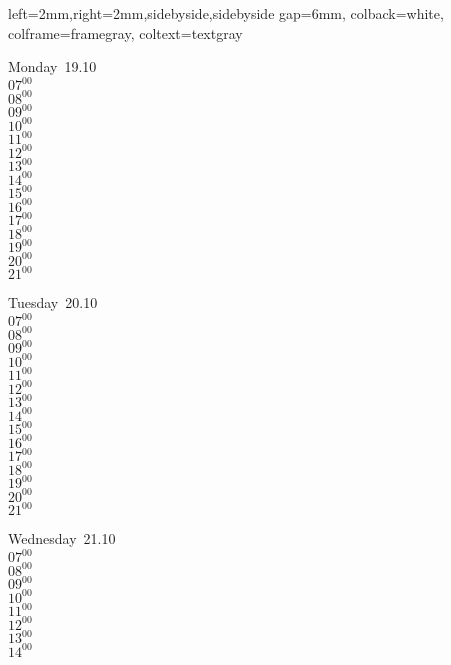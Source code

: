 \documentclass[11pt,a4paper]{book}\usepackage[]{graphicx}\usepackage[]{color}
\begin{document}
{{{{{{{{{{{{{{{{        left=2mm,right=2mm,sidebyside,sidebyside gap=6mm,%
        colback=white, colframe=framegray, coltext=textgray}
%
\begin{tcolorbox}
Monday~19.10\\
{ 
$07^{00}$\\
$08^{00}$\\
$09^{00}$\\
$10^{00}$\\
$11^{00}$\\
$12^{00}$\\
$13^{00}$\\
$14^{00}$\\
$15^{00}$\\
$16^{00}$\\
$17^{00}$\\
$18^{00}$\\
$19^{00}$\\
$20^{00}$\\
$21^{00}$}\\
\end{tcolorbox}
%
\begin{tcolorbox}
Tuesday~20.10\\
{ 
$07^{00}$\\
$08^{00}$\\
$09^{00}$\\
$10^{00}$\\
$11^{00}$\\
$12^{00}$\\
$13^{00}$\\
$14^{00}$\\
$15^{00}$\\
$16^{00}$\\
$17^{00}$\\
$18^{00}$\\
$19^{00}$\\
$20^{00}$\\
$21^{00}$}\\
\end{tcolorbox}
%
\begin{tcolorbox}
Wednesday~21.10\\
{ 
$07^{00}$\\
$08^{00}$\\
$09^{00}$\\
$10^{00}$\\
$11^{00}$\\
$12^{00}$\\
$13^{00}$\\
$14^{00}$\\
}
\end{tcolorbox}}}}}}}}}}}}}}}}
\end{document}
